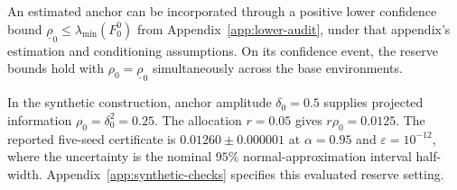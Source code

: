 An estimated anchor can be incorporated through a positive lower confidence bound $\underline\rho_0\le\lambda_{\min}(F_0^0)$ from Appendix~\ref{app:lower-audit}, under that appendix's estimation and conditioning assumptions. On its confidence event, the reserve bounds hold with $\rho_0=\underline\rho_0$ simultaneously across the base environments.

In the synthetic construction, anchor amplitude $\delta_0=0.5$ supplies projected information $\rho_0=\delta_0^2=0.25$. The allocation $r=0.05$ gives $r\rho_0=0.0125$. The reported five-seed certificate is $0.01260\pm0.000001$ at $\alpha=0.95$ and $\varepsilon=10^{-12}$, where the uncertainty is the nominal $95\%$ normal-approximation interval half-width. Appendix~\ref{app:synthetic-checks} specifies this evaluated reserve setting.
